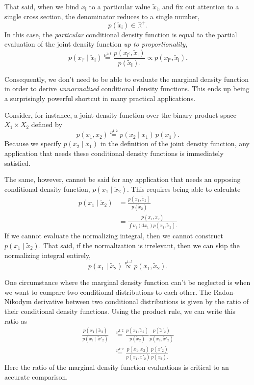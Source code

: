 \documentclass[
  letterpaper,
  DIV=11,
  numbers=noendperiod]{scrartcl}
\begin{document}
That said, when we bind \(x_{ \mathsf{i} }\) to a particular value
\(\tilde{x}_{ \mathsf{i} }\), and fix out attention to a single cross
section, the denominator reduces to a single number, \[
p( \tilde{x}_{ \mathsf{i} } ) \in \mathbb{R}^{+}.
\] In this case, the \emph{particular} conditional density function is
equal to the partial evaluation of the joint density function \emph{up
to proportionality}, \[
p( x_{\mathsf{i}^{c}} \mid \tilde{x}_{ \mathsf{i} } )
\overset{ \nu^{1:I} }{=}
\frac{
  p( x_{\mathsf{i}^{c}}, \tilde{x}_{ \mathsf{i} } )
}{
  p( \tilde{x}_{ \mathsf{i} } ).
}
\propto
p( x_{\mathsf{i}^{c}}, \tilde{x}_{ \mathsf{i} } ).
\]

Consequently, we don't need to be able to evaluate the marginal density
function in order to derive \emph{unnormalized} conditional density
functions. This ends up being a surprisingly powerful shortcut in many
practical applications.

Consider, for instance, a joint density function over the binary product
space \(X_{1} \times X_{2}\) defined by \[
p( x_{1}, x_{2} )
\overset{ \nu^{1:2} }{=}
p( x_{2} \mid x_{1} ) \, p( x_{1} ).
\] Because we specify \(p( x_{2} \mid x_{1} )\) in the definition of the
joint density function, any application that needs these conditional
density functions is immediately satisfied.

The same, however, cannot be said for any application that needs an
opposing conditional density function,
\(p( x_{1} \mid \tilde{x}_{2} )\). This requires being able to calculate
\begin{align*}
p( x_{1} \mid \tilde{x}_{2} )
&=
\frac{
  p( x_{1}, \tilde{x}_{2} )
}{
  p( \tilde{x}_{2} )
}
\\
&=
\frac{
  p( x_{1}, \tilde{x}_{2} )
}{
  \int \nu_{1}( \mathrm{d} x_{1}) p( x_{1}, \tilde{x}_{2} ).
}
\end{align*} If we cannot evaluate the normalizing integral, then we
cannot construct \(p( x_{1} \mid \tilde{x}_{2} )\). That said, if the
normalization is irrelevant, then we can skip the normalizing integral
entirely, \[
p( x_{1} \mid \tilde{x}_{2} )
\overset{ \nu^{1:I} }{\propto}
p( x_{1}, \tilde{x}_{2} ).
\]

One circumstance where the marginal density function can't be neglected
is when we want to compare two conditional distributions to each other.
The Radon-Nikodym derivative between two conditional distributions is
given by the ratio of their conditional density functions. Using the
product rule, we can write this ratio as \begin{align*}
\frac{
  p( x_{1} \mid \tilde{x}_{2} )
}{
  p( x_{1} \mid \tilde{x}'_{2} )
}
&\overset{ \nu^{1:2} }{=}
\frac{
  p( x_{1}, \tilde{x}_{2} )
}{
  p( \tilde{x}_{2} )
}
\frac{
  p( \tilde{x}'_{2} )
}{
  p( x_{1}, \tilde{x}'_{2} )
}
\\
&\overset{ \nu^{1:2} }{=}
\frac{
  p( x_{1}, \tilde{x}_{2} )
}{
  p( x_{1}, \tilde{x}'_{2} )
}
\frac{
  p( \tilde{x}'_{2} )
}{
  p( \tilde{x}_{2} ).
}
\end{align*} Here the ratio of the marginal density function evaluations
is critical to an accurate comparison.
\end{document}
